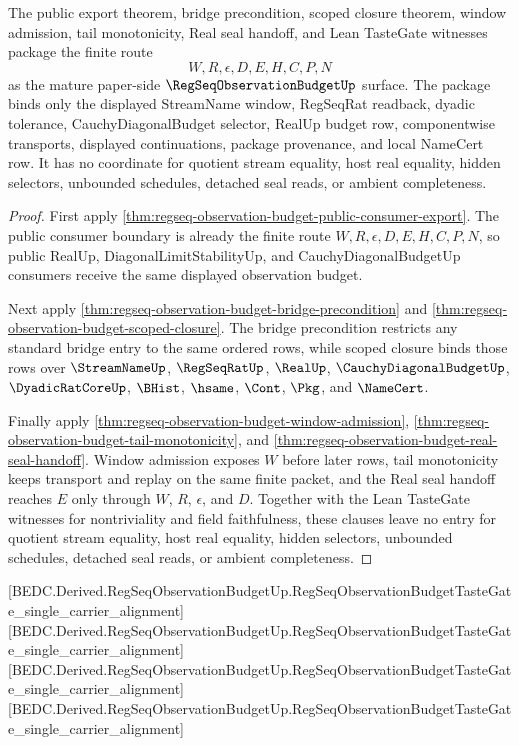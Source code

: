 \begin{theorem}\label{thm:regseq-observation-budget-mature-package}
The public export theorem, bridge precondition, scoped closure theorem, window admission, tail monotonicity, Real seal handoff, and Lean TasteGate witnesses package the finite route
$$
W,R,\epsilon,D,E,H,C,P,N
$$
as the mature paper-side $\RegSeqObservationBudgetUp$ surface. The package binds only the displayed StreamName window, RegSeqRat readback, dyadic tolerance, CauchyDiagonalBudget selector, RealUp budget row, componentwise transports, displayed continuations, package provenance, and local NameCert row. It has no coordinate for quotient stream equality, host real equality, hidden selectors, unbounded schedules, detached seal reads, or ambient completeness.
\end{theorem}
\begin{proof}
First apply \autoref{thm:regseq-observation-budget-public-consumer-export}. The public consumer boundary is already the finite route $W,R,\epsilon,D,E,H,C,P,N$, so public RealUp, DiagonalLimitStabilityUp, and CauchyDiagonalBudgetUp consumers receive the same displayed observation budget.

Next apply \autoref{thm:regseq-observation-budget-bridge-precondition} and \autoref{thm:regseq-observation-budget-scoped-closure}. The bridge precondition restricts any standard bridge entry to the same ordered rows, while scoped closure binds those rows over $\StreamNameUp$, $\RegSeqRatUp$, $\RealUp$, $\CauchyDiagonalBudgetUp$, $\DyadicRatCoreUp$, $\BHist$, $\hsame$, $\Cont$, $\Pkg$, and $\NameCert$.

Finally apply \autoref{thm:regseq-observation-budget-window-admission}, \autoref{thm:regseq-observation-budget-tail-monotonicity}, and \autoref{thm:regseq-observation-budget-real-seal-handoff}. Window admission exposes $W$ before later rows, tail monotonicity keeps transport and replay on the same finite packet, and the Real seal handoff reaches $E$ only through $W$, $R$, $\epsilon$, and $D$. Together with the Lean TasteGate witnesses for nontriviality and field faithfulness, these clauses leave no entry for quotient stream equality, host real equality, hidden selectors, unbounded schedules, detached seal reads, or ambient completeness.
\end{proof}

[BEDC.Derived.RegSeqObservationBudgetUp.RegSeqObservationBudgetTasteGate\_single\_carrier\_alignment]
[BEDC.Derived.RegSeqObservationBudgetUp.RegSeqObservationBudgetTasteGate\_single\_carrier\_alignment]
[BEDC.Derived.RegSeqObservationBudgetUp.RegSeqObservationBudgetTasteGate\_single\_carrier\_alignment]
[BEDC.Derived.RegSeqObservationBudgetUp.RegSeqObservationBudgetTasteGate\_single\_carrier\_alignment]

